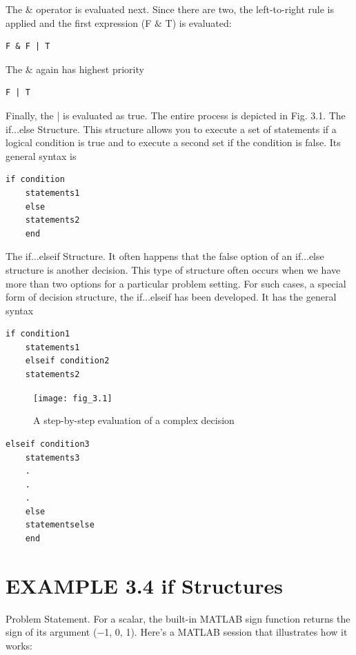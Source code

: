 \documentclass[../main.tex]{subfiles}
\begin{document}
The $\&$ operator is evaluated next. Since there are two, the left-to-right rule is applied and
the first expression (F $\&$ T) is evaluated:
\begin{lstlisting}[frame=none, numbers=none]
    F & F | T
\end{lstlisting}

The $\&$ again has highest priority
\begin{lstlisting}[frame=none, numbers=none]
    F | T
\end{lstlisting}

Finally, the | is evaluated as true. The entire process is depicted in Fig. 3.1.
The if$\ldots$else Structure. This structure allows you to execute a set of statements if
a logical condition is true and to execute a second set if the condition is false. Its general
syntax is
\begin{lstlisting}[frame=none, numbers=none]
    if condition
    statements1
    else
    statements2
    end
\end{lstlisting}
The if$\ldots$elseif Structure. It often happens that the false option of an if$\ldots$else
structure is another decision. This type of structure often occurs when we have more than
two options for a particular problem setting. For such cases, a special form of decision
structure, the if$\ldots$elseif has been developed. It has the general syntax
\begin{lstlisting}[frame=none, numbers=none]
    if condition1
    statements1
    elseif condition2
    statements2
\end{lstlisting}

\begin{figure}[H]
    \centering
    \texttt{[image: fig\_3.1]}
    \caption{A step-by-step evaluation of a complex decision}
\end{figure}

\begin{lstlisting}[frame=none, numbers=none]
    elseif condition3
    statements3
    .
    .
    .
    else
    statementselse
    end
\end{lstlisting}

\section*{EXAMPLE 3.4 if Structures}

Problem Statement. For a scalar, the built-in MATLAB sign function returns the sign
of its argument (−1, 0, 1). Here’s a MATLAB session that illustrates how it works:
\end{document}
